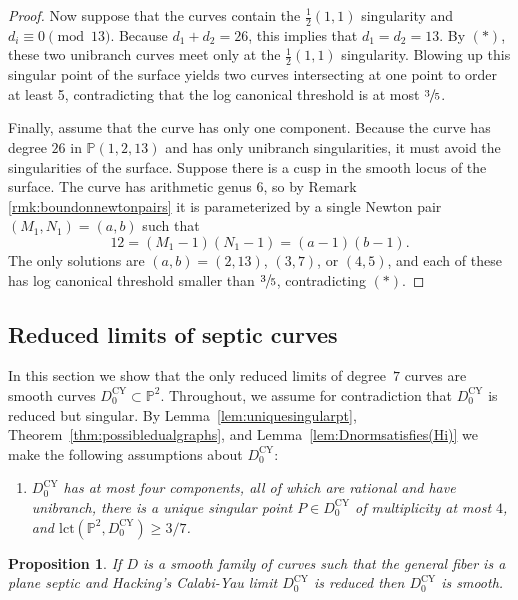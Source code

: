 \documentclass[JEP,XML,SOM,Unicode,NoFloatCountersInSection,published]{cedram}
\theoremstyle{plain}
\newtheorem{proposition}[theorem]{Proposition}
\theoremstyle{definition}
\newcommand\PP{{\mathbb{P}}}
\newcommand\lct{\mathrm{lct}}
\newcommand\Dcyo{{D^{\mathrm{CY}}_0}}
\begin{document}
\begin{proof}
Now suppose that the curves contain the $\frac{1}{2}(1,1)$ singularity and $d_i \equiv 0 \pmod{13}$. Because $d_1 + d_2 = 26$, this implies that $d_1 = d_2 = 13$. By $(\ast)$, these two unibranch curves meet only at the $\frac{1}{2}(1,1)$ singularity. Blowing up this singular point of the surface yields two curves intersecting at one point to order at least 5, contradicting that the log canonical threshold is at most $\sfrac{3}{5}$.

Finally, assume that the curve has only one component. Because the curve has degree $26$ in $\PP(1,2,13)$ and has only unibranch singularities, it must avoid the singularities of the surface. Suppose there is a cusp in the smooth locus of the surface. The curve has arithmetic genus 6, so by Remark \ref{rmk:boundonnewtonpairs} it is parameterized by a single Newton pair $(M_1, N_1) = (a,b)$ such that
\[ 12 = (M_1 - 1)(N_1 - 1) = (a-1)(b-1).\]
The only solutions are $(a,b) = (2,13)$, $(3,7)$, or $(4,5)$, and each of these has log canonical threshold smaller than $\sfrac{3}{5}$, contradicting $(\ast)$.
\end{proof}

\subsection{Reduced limits of septic curves}
In this section we show that the only reduced limits of degree~$7$ curves are smooth curves $\Dcyo\subset \PP^2$. Throughout, we assume for contradiction that $\Dcyo$ is reduced but singular. By Lemma~\ref{lem:uniquesingularpt}, Theorem~\ref{thm:possibledualgraphs}, and Lemma~\ref{lem:Dnormsatisfies(Hi)} we make the following assumptions about $\Dcyo$:

\begin{enumerate}
\item[($\diamond$)] \textit{$\Dcyo$ has at most four components, all of which are rational and have unibranch, there is a unique singular point $P\in \Dcyo$ of multiplicity at most $4$, and $\lct(\PP^2,\Dcyo)\ge 3/7$.}
\end{enumerate}

\begin{proposition}\label{reducedimpliessmooth}
If $D$ is a smooth family of curves such that the general fiber is a plane septic and Hacking's Calabi-Yau limit $\Dcyo$ is reduced then $\Dcyo$ is smooth.
\end{proposition}
\end{document}
